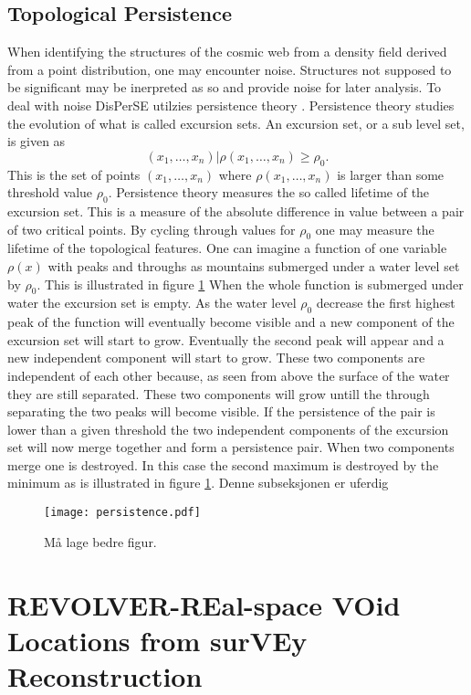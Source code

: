 \subsection{Topological Persistence}
When identifying the structures of the cosmic web from a density field derived
from a point distribution, one may
encounter noise. Structures not supposed to be significant may be inerpreted as
so and provide noise for later analysis. To deal with noise DisPerSE utilzies
persistence theory \cite{persistence}. Persistence theory studies the evolution
of what is called excursion sets. An excursion set, or a sub level set, is given as
\begin{equation}
    (x_1,\dots, x_n)\vert\rho(x_1,\dots, x_n)\geq\rho_0.
\end{equation}
This is the set of points $(x_1,\dots, x_n)$ where $\rho(x_1,\dots, x_n)$ is
larger than some threshold value $\rho_0$. Persistence theory measures the so
called lifetime of the excursion set. This is a measure of the absolute
difference in value between a pair of two critical points. By cycling through
values for $\rho_0$ one may measure the lifetime of the topological features.
One can imagine a function of one variable $\rho(x)$ with peaks and throughs as
mountains submerged under a water level set by $\rho_0$. This is illustrated in
figure \ref{fig:persistence}
When the whole function is submerged under water the excursion set is empty. As
the water level $\rho_0$ decrease the first highest peak of the function will
eventually become visible and a new component of the excursion set will start to
grow. Eventually the second peak will appear and a new independent component
will start to grow. These two components are independent of each other because,
as seen from above the surface of the water they are still separated. These two
components will grow untill the through separating the two peaks will become
visible. If the persistence of the pair is lower than a given threshold the two independent components of the excursion set will now merge
together and form a persistence pair. When two components merge one is
destroyed. In this case the second maximum is destroyed by the minimum as is
illustrated in figure \ref{fig:persistence}. Denne subseksjonen er uferdig



\begin{figure}\label{fig:persistence}
   \texttt{[image: persistence.pdf]}
   \caption{Må lage bedre figur.}
\end{figure}
\section{REVOLVER-REal-space VOid Locations from surVEy Reconstruction}